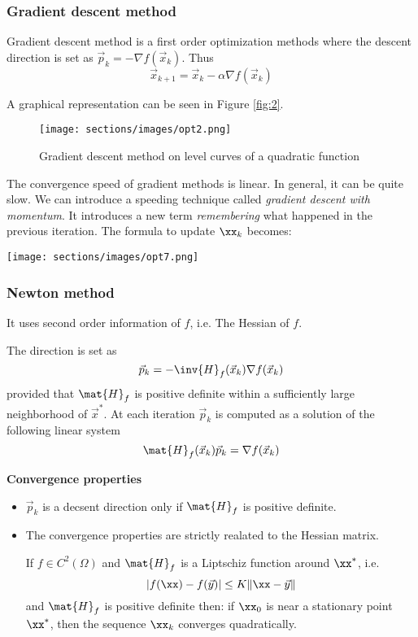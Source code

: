 \subsubsection{Gradient descent method }

Gradient descent method is a first order optimization methods where the descent direction 
 is set as $\vec{p}_k = -\nabla{f}(\vec{x}_k)$.
 Thus
$$ \vec{x}_{k+1} = \vec{x}_k - \alpha\nabla{f}(\vec{x}_k) $$

A graphical representation can be seen in Figure \ref{fig:2}.

\begin{figure}
\texttt{[image: sections/images/opt2.png]}
\caption{Gradient descent method on level curves of a quadratic function}
\label{fig:1}\end{figure}

The convergence speed of gradient methods is linear. In general, it can be quite slow.
 We can introduce a speeding technique called \textit{gradient descent with momentum}.
 It introduces a new term \textit{remembering} what happened in the previous iteration.
 The formula to update $\xx_k$ becomes:
 
\texttt{[image: sections/images/opt7.png]}

\subsubsection{Newton method}
It uses second order information of $f$, i.e. The Hessian of $f$.

The direction is set as
$$ \vec{p}_k = -\inv{H}_f(\vec{x}_k)\nabla{f}(\vec{x}_k) $$
provided that $\mat{H}_f$ is positive definite within a sufficiently large neighborhood of $\vec{x}^*$. At each iteration $\vec{p}_k$ is computed as a solution of the following linear system
$$ \mat{H}_f(\vec{x}_k)\vec{p}_k = \nabla{f}(\vec{x}_k) $$

\textbf{Convergence properties}
\begin{itemize}
    \item $\vec{p}_k$ is a decsent direction only if $\mat{H}_f$ is positive definite.
    \item The convergence properties are strictly realated to the Hessian matrix.
    \begin{proposition}
        If $f \in C^2(\Omega)$ and $\mat{H}_f$ is a Liptschiz function around $\xx^*$, i.e.
        $$|f(\xx) -f(\vec{y})| \leq K \|\xx-\vec{y} \|$$
        and $\mat{H}_f$ is positive definite then:
      if $\xx_0$ is near a stationary point $\xx^*$, then the sequence $\xx_k$ converges quadratically.
    \end{proposition}
    
\end{itemize}

